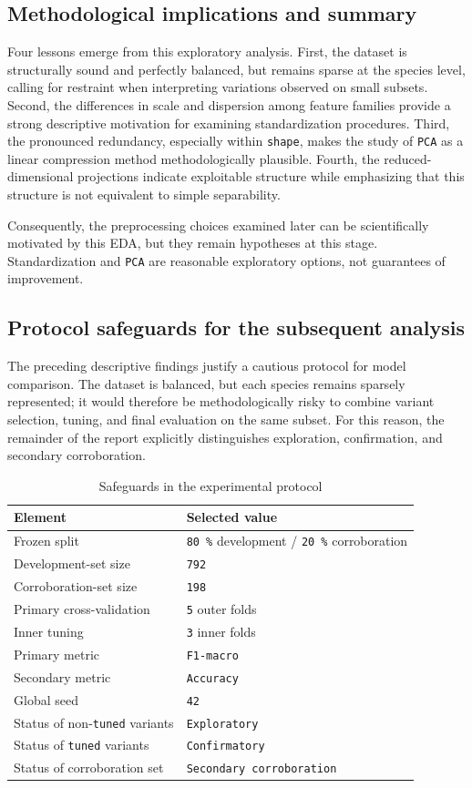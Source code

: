 \subsection{Methodological implications and summary}
Four lessons emerge from this exploratory analysis. First, the dataset is structurally sound and perfectly balanced, but remains sparse at the species level, calling for restraint when interpreting variations observed on small subsets. Second, the differences in scale and dispersion among feature families provide a strong descriptive motivation for examining standardization procedures. Third, the pronounced redundancy, especially within \texttt{shape}, makes the study of \texttt{PCA} as a linear compression method methodologically plausible. Fourth, the reduced-dimensional projections indicate exploitable structure while emphasizing that this structure is not equivalent to simple separability.

Consequently, the preprocessing choices examined later can be scientifically motivated by this EDA, but they remain hypotheses at this stage. Standardization and \texttt{PCA} are reasonable exploratory options, not guarantees of improvement.

\subsection{Protocol safeguards for the subsequent analysis}
The preceding descriptive findings justify a cautious protocol for model comparison. The dataset is balanced, but each species remains sparsely represented; it would therefore be methodologically risky to combine variant selection, tuning, and final evaluation on the same subset. For this reason, the remainder of the report explicitly distinguishes exploration, confirmation, and secondary corroboration.

\begin{table}[H]
\centering
\begin{tabular}{|l|l|}
\hline
\textbf{Element} & \textbf{Selected value} \\
\hline
Frozen split & \texttt{80 \%} development / \texttt{20 \%} corroboration \\
Development-set size & \texttt{792} \\
Corroboration-set size & \texttt{198} \\
Primary cross-validation & \texttt{5} outer folds \\
Inner tuning & \texttt{3} inner folds \\
Primary metric & \texttt{F1-macro} \\
Secondary metric & \texttt{Accuracy} \\
Global seed & \texttt{42} \\
Status of non-\texttt{tuned} variants & \texttt{Exploratory} \\
Status of \texttt{tuned} variants & \texttt{Confirmatory} \\
Status of corroboration set & \texttt{Secondary corroboration} \\
\hline
\end{tabular}
\caption{Safeguards in the experimental protocol}
\end{table}

